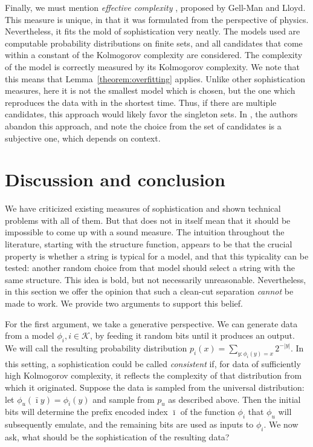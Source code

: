 \documentclass{style/llncs}
\newcommand{\K}{\mathscr K}
\begin{document}
Finally, we must mention \emph{effective complexity} \cite{gellmann1996information}, proposed by Gell-Man and Lloyd. This measure is unique, in that it was formulated from the perspective of physics. Nevertheless, it fits the mold of sophistication very neatly. The models used are computable probability distributions on finite sets, and all candidates that come within a constant of the Kolmogorov complexity are considered. The complexity of the model is correctly measured by its Kolmogorov complexity. We note that this means that Lemma~\ref{theorem:overfitting} applies. Unlike other sophistication measures, here it is not the smallest model which is chosen, but the one which reproduces the data with in the shortest time. Thus, if there are multiple candidates, this approach would likely favor the singleton sets. In \cite{gell2004nonextensive}, the authors abandon this approach, and note the choice from the set of candidates is a subjective one, which depends on context.

\section{Discussion and conclusion}
\label{section:conclusion} 

We have criticized existing measures of sophistication and shown technical problems with all of them. But that does not in itself mean that it should be impossible to come up with a sound measure. The intuition throughout the literature, starting with the structure function, appears to be that the crucial property is whether a string is typical for a model, and that this typicality can be tested: another random choice from that model should select a string with the same structure. This idea is bold, but not necessarily unreasonable. Nevertheless, in this section we offer the opinion that such a clean-cut separation \emph{cannot} be made to work. We provide two arguments to support this belief.

For the first argument, we take a generative perspective. We can generate data from a model $\phi_i, i \in \K$, by feeding it random bits until it produces an output. We will call the resulting probability distribution $p_i(x) = \sum_{y:\phi_i(y) = x} 2^{-|y|}$. In this setting, a sophistication could be called \emph{consistent} if, for data of sufficiently high Kolmogorov complexity, it reflects the complexity of that distribution from which it originated. Suppose the data is sampled from the universal distribution: let $\phi_u(\bar\imath y)=\phi_i(y)$ and sample from $p_u$ as described above. Then the initial bits will determine the prefix encoded index $\bar\imath$ of the function $\phi_i$ that $\phi_u$ will subsequently emulate, and the remaining bits are used as inputs to $\phi_i$. We now ask, what should be the sophistication of the resulting data? 
\enlargethispage{3\baselineskip}
 
\end{document}
